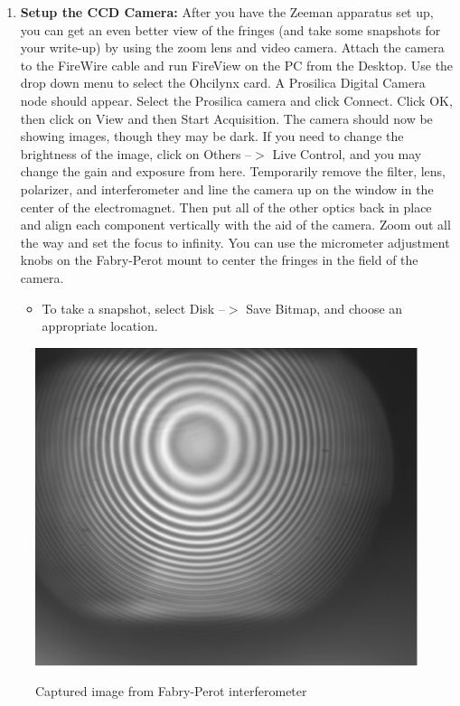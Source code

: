 \documentclass{../lab}
\begin{document}
\begin{enumerate}
\begin{itemize}
\begin{itemize}
\begin{enumerate}
                \item \textbf{Setup the CCD Camera:} After you have the Zeeman apparatus set up, you can get an even better view of the fringes (and take some snapshots for your write-up) by using the zoom lens and video camera. Attach the camera to the FireWire cable and run FireView on the PC from the Desktop. Use the drop down menu to select the Ohcilynx card. A Prosilica Digital Camera node should appear. Select the Prosilica camera and click Connect. Click OK, then click on View and then Start Acquisition. The camera should now be showing images, though they may be dark. If you need to change the brightness of the image, click on Others --$>$ Live Control, and you may change the gain and exposure from here. Temporarily remove the filter, lens, polarizer, and interferometer and line the camera up on the window in the center of the electromagnet. Then put all of the other optics back in place and align each component vertically with the aid of the camera. Zoom out all the way and set the focus to infinity. You can use the micrometer adjustment knobs on the Fabry-Perot mount to center the fringes in the field of the camera.
            
                \begin{itemize}
                    \item To take a snapshot, select Disk --$>$ Save Bitmap, and choose an appropriate location.
                \end{itemize}
            
            \end{enumerate}

        \end{itemize}
        
    \end{itemize}
    
    \begin{figure}[H]
    \centering
        \href{http://experimentationlab.berkeley.edu/sites/default/files/images/Atmimage031.gif}{\includegraphics[width=0.6\linewidth]{images/Atmimage031.png}} \\
        \caption{Captured image from Fabry-Perot interferometer}
        \label{CapturedImage}
    \end{figure}
    

\end{enumerate}
\end{document}
